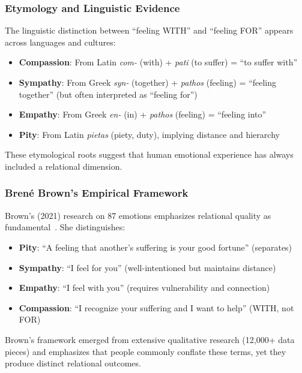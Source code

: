 \subsubsection{Etymology and Linguistic Evidence}

The linguistic distinction between ``feeling WITH'' and ``feeling FOR'' appears across languages and cultures:

\begin{itemize}
    \item \textbf{Compassion}: From Latin \textit{com-} (with) + \textit{pati} (to suffer) = ``to suffer with''
    \item \textbf{Sympathy}: From Greek \textit{syn-} (together) + \textit{pathos} (feeling) = ``feeling together'' (but often interpreted as ``feeling for'')
    \item \textbf{Empathy}: From Greek \textit{en-} (in) + \textit{pathos} (feeling) = ``feeling into''
    \item \textbf{Pity}: From Latin \textit{pietas} (piety, duty), implying distance and hierarchy
\end{itemize}

These etymological roots suggest that human emotional experience has always included a relational dimension.

\subsubsection{Brené Brown's Empirical Framework}

Brown's (2021) research on 87 emotions emphasizes relational quality as fundamental~\cite{brown2021}. She distinguishes:

\begin{itemize}
    \item \textbf{Pity}: ``A feeling that another's suffering is your good fortune'' (separates)
    \item \textbf{Sympathy}: ``I feel for you'' (well-intentioned but maintains distance)
    \item \textbf{Empathy}: ``I feel with you'' (requires vulnerability and connection)
    \item \textbf{Compassion}: ``I recognize your suffering and I want to help'' (WITH, not FOR)
\end{itemize}

Brown's framework emerged from extensive qualitative research (12,000+ data pieces) and emphasizes that people commonly conflate these terms, yet they produce distinct relational outcomes.

